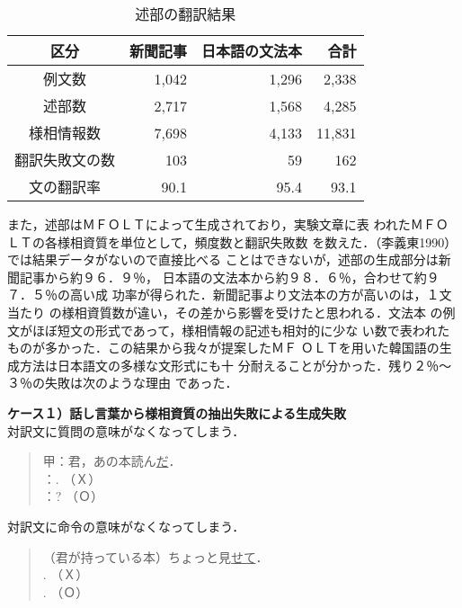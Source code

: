 \begin{table}[htb]
\begin{center}
\caption{述部の翻訳結果}
\begin{tabular}{|c|r|r|r|}\hline
区分           & 新聞記事 & 日本語の文法本 & 合計 \\ \hline 
例文数         & 1,042    & 1,296          & 2,338\\ \hline
述部数         & 2,717    & 1,568          & 4,285\\ \hline 
様相情報数     & 7,698    & 4,133          & 11,831\\ \hline 
翻訳失敗文の数 & 103      & 59             & 162   \\ \hline
文の翻訳率     & 90.1     & 95.4           & 93.1  \\ \hline 
\end{tabular}
\end{center}
\end{table}

また，述部はＭＦＯＬＴによって生成されており，実験文章に表
われたＭＦＯＬＴの各様相資質を単位として，頻度数と翻訳失敗数
を数えた．（李義東1990）では結果データがないので直接比べる
ことはできないが，述部の生成部分は新聞記事から約９６．９％，
日本語の文法本から約９８．６％，合わせて約９７．５％の高い成
功率が得られた．新聞記事より文法本の方が高いのは，１文当たり
の様相資質数が違い，その差から影響を受けたと思われる．文法本
の例文がほぼ短文の形式であって，様相情報の記述も相対的に少な
い数で表われたものが多かった．この結果から我々が提案したＭＦ
ＯＬＴを用いた韓国語の生成方法は日本語文の多様な文形式にも十
分耐えることが分かった．残り２％〜３％の失敗は次のような理由
であった．

\vspace{5mm}
\noindent
{\bf ケース１）話し言葉から様相資質の抽出失敗による生成失敗}\\
\hspace*{4mm}対訳文に質問の意味がなくなってしまう．
\begin{quote}
甲：君，あの本読ん\underline{だ}．\\
：\underline{}. （Ｘ）\\
：\underline{}? （Ｏ）
\end{quote}
\hspace*{4mm}対訳文に命令の意味がなくなってしまう．
\begin{quote}
（君が持っている本）ちょっと見\underline{せて}．\\
\underline{}. （Ｘ）\\
\underline{}. （Ｏ）
\end{quote}
\vspace{5mm}

